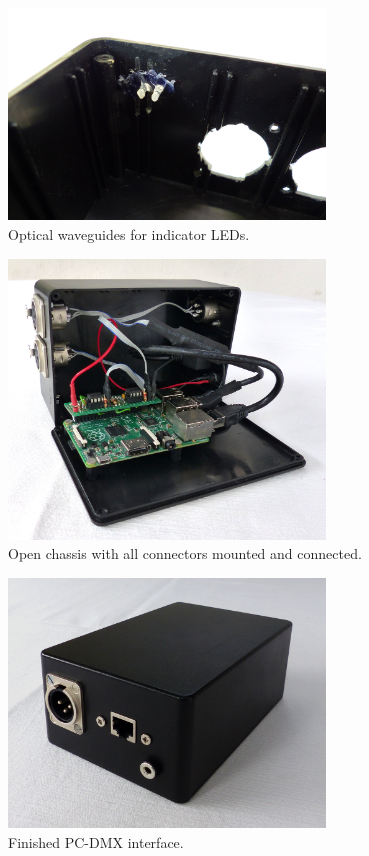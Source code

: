 \begin{figure}
\centering
\includegraphics[width=0.75000\textwidth]{Bilder/chassis-indicator-leds.jpg}
\caption[Optical waveguides for indicator LEDs]{Optical waveguides for indicator LEDs.}
\end{figure}

\begin{figure}
\centering
\includegraphics[width=0.75000\textwidth]{Bilder/chassis-open.jpg}
\caption[Open chassis with all connectors mounted and connected]{Open chassis with all connectors mounted and connected.}
\end{figure}

\begin{figure}
\centering
\includegraphics[width=0.75000\textwidth]{Bilder/chassis-finished-front.jpg}
\caption[Finished PC-DMX interface]{Finished PC-DMX interface.}
\end{figure}

